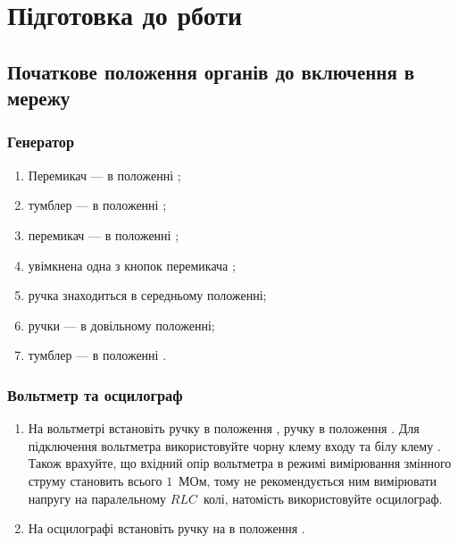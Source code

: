 \documentclass[]{LabWork}
\begin{document}
\section{Підготовка до рботи}

\subsection*{Початкове положення органів до включення в мережу}

\subsubsection*{Генератор}

\begin{enumerate}
	\item Перемикач  --- в положенні  ;
	\item тумблер  --- в положенні ;
	\item перемикач  --- в положенні ;
	\item увімкнена одна з кнопок перемикача ;
	\item ручка  знаходиться в середньому положенні;
	\item ручки  --- в довільному положенні;
	\item тумблер  --- в положенні .
\end{enumerate}

\subsubsection*{Вольтметр  та осцилограф }

\begin{enumerate}
	\item На вольтметрі  встановіть ручку  в положення , ручку   в положення . Для підключення вольтметра використовуйте чорну клему входу   та білу клему  . Також врахуйте, що вхідний опір вольтметра в режимі вимірювання змінного струму становить всього $1$~МОм, тому не рекомендується ним вимірювати напругу на паралельному $RLC$~колі, натомість використовуйте осцилограф.
	\item На осцилографі  встановіть ручку  на  в положення .
\end{enumerate}
\end{document}
